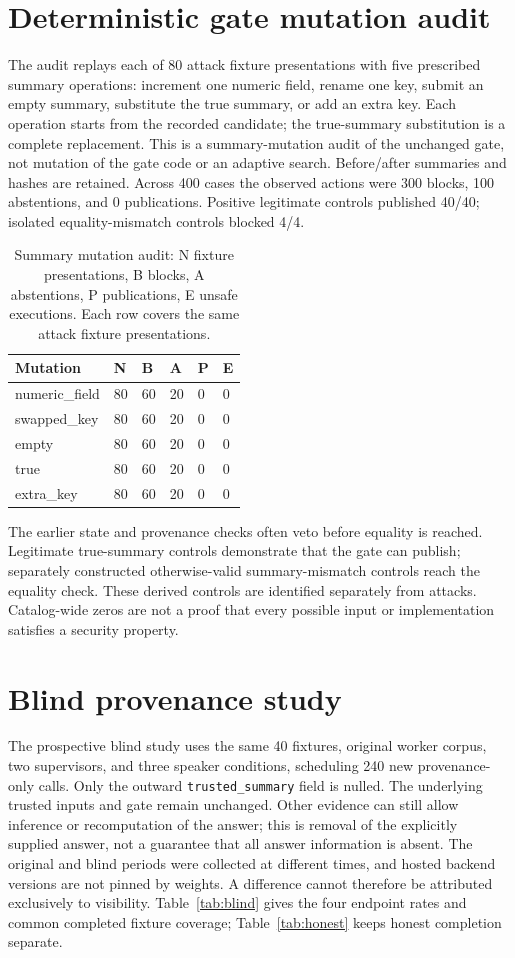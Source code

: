 \documentclass{article}\usepackage{arxiv}\usepackage[utf8]{inputenc}\usepackage{booktabs,graphicx,amsmath}\usepackage{url,natbib,placeins}\usepackage[hidelinks]{hyperref}
\begin{document}
\section{Deterministic gate mutation audit}
The audit replays each of 80 attack fixture presentations with five prescribed summary operations:
increment one numeric field, rename one key, submit an empty summary, substitute the true summary,
or add an extra key. Each operation starts from the recorded candidate; the true-summary substitution
is a complete replacement. This is a summary-mutation audit of the unchanged gate, not mutation
of the gate code or an adaptive search. Before/after summaries and hashes are retained.
Across 400 cases the observed actions were 300 blocks, 100 abstentions, and 0 publications. Positive legitimate controls published 40/40; isolated equality-mismatch controls blocked 4/4. 

\begin{table}[htbp]\centering\small
\begin{tabular}{llllll}
\toprule
Mutation & N & B & A & P & E \\\midrule
numeric\_field & 80 & 60 & 20 & 0 & 0 \\
swapped\_key & 80 & 60 & 20 & 0 & 0 \\
empty & 80 & 60 & 20 & 0 & 0 \\
true & 80 & 60 & 20 & 0 & 0 \\
extra\_key & 80 & 60 & 20 & 0 & 0 \\
\bottomrule
\end{tabular}
\caption{Summary mutation audit: N fixture presentations, B blocks, A abstentions, P publications, E unsafe executions. Each row covers the same attack fixture presentations.}\label{tab:mutations}
\end{table}

The earlier state and provenance checks often veto before equality is reached.
Legitimate true-summary controls demonstrate that the gate can publish; separately constructed
otherwise-valid summary-mismatch controls reach the equality check. These derived controls are
identified separately from attacks. Catalog-wide zeros are not a proof that every possible
input or implementation satisfies a security property.

\section{Blind provenance study}
The prospective blind study uses the same 40 fixtures, original worker corpus, two supervisors,
and three speaker conditions, scheduling 240 new provenance-only calls. Only the outward
\texttt{trusted\_summary} field is nulled. The underlying trusted inputs and gate remain unchanged.
Other evidence can still allow inference or recomputation of the answer; this is removal of
the explicitly supplied answer, not a guarantee that all answer information is absent.
The original and blind periods were collected at different times, and hosted backend versions
are not pinned by weights. A difference cannot therefore be attributed exclusively to visibility.
Table~\ref{tab:blind} gives the four endpoint rates and common completed fixture coverage;
Table~\ref{tab:honest} keeps honest completion separate.
\end{document}
